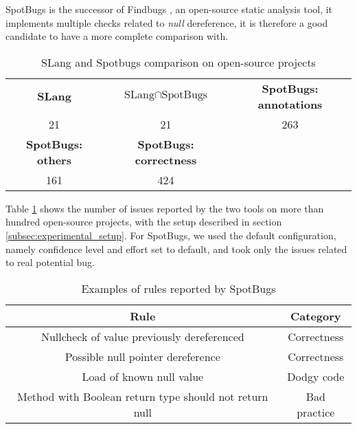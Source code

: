 SpotBugs \cite{Spotbugs:2019:Online} is the successor of Findbugs \cite{FindBugs:2019:Online}, an open-source static analysis tool, it implements multiple checks related to \emph{null} dereference, it is therefore a good candidate to have a more complete comparison with.

\begin{table}[h]
	\centering
	\caption{SLang and Spotbugs comparison on open-source projects}
	\label{table:slang_vs_spotbugs}
	\begin{tabular}{|c|c|c|}
		\hline
		\bf SLang & \bf $\text{SLang} \cap \text{SpotBugs}$ & \bf SpotBugs: annotations \\
		21 & 21 & 263 \\ \hline
		\bf SpotBugs: others & \bf SpotBugs: correctness & \\ 
		161 & 424 &  \\ \hline
	\end{tabular}
\end{table}

Table \ref{table:slang_vs_spotbugs} shows the number of issues reported by the two tools on more than hundred open-source projects, with the setup described in section \ref{subsec:experimental_setup}. 
For SpotBugs, we used the default configuration, namely confidence level and effort set to default, and took only the issues related to real potential bug.

\begin{table}[h]
	\centering
	\caption{Examples of rules reported by SpotBugs}
	\label{table:spotbugs-rules}
	\begin{tabular}{|c|c|}
		\hline
		\bf Rule & \bf Category\\ \hline
		Nullcheck of value previously dereferenced & Correctness  \\
		Possible null pointer dereference & Correctness  \\
		Load of known null value & Dodgy code \\
		Method with Boolean return type should not return null & Bad practice \\ \hline
	\end{tabular}
\end{table}

